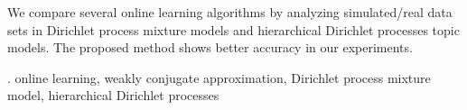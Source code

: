 \documentclass[12pt]{article}
\begin{document}
We compare several online learning algorithms by analyzing simulated/real data sets in Dirichlet process mixture models and hierarchical Dirichlet processes topic models. The proposed method shows better accuracy in our experiments.

\vskip 2mm

.
online learning, weakly conjugate approximation, Dirichlet process mixture model, hierarchical Dirichlet processes
\end{document}
